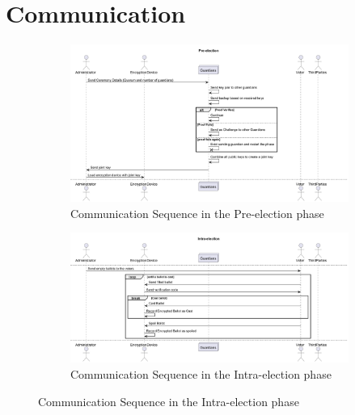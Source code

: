\section{Communication}
\begin{figure}[ht]
    \centering
    \begin{subfigure}[b]{\textwidth}
        \centering
        \includegraphics[width=\textwidth]{abbildungen/Diagramme/communication-seq.png}
        \caption{Communication Sequence in the Pre-election phase}
        \label{Fig:comm-pre}
    \end{subfigure}
    \hfill
    \begin{subfigure}[b]{\textwidth}
        \centering
        \includegraphics[width=\textwidth]{abbildungen/Diagramme/communication-seq_001.png}
        \caption{Communication Sequence in the Intra-election phase}
        \label{Fig:comm-intra}
    \end{subfigure}

\end{figure}
